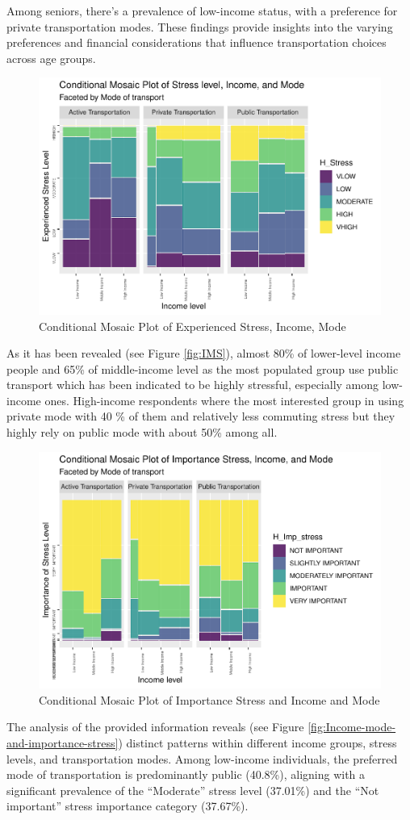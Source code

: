 \documentclass[
11pt, %
oneside, %
english, %
singlespacing, %
]{macthesis} %
\begin{document}
Among seniors, there's a prevalence of low-income status, with a preference for private transportation modes. These findings provide insights into the varying preferences and financial considerations that influence transportation choices across age groups.
\begin{figure}
\includegraphics[width=0.85\linewidth]{thesis_files/figure-latex/unnamed-chunk-31-1} \caption{\label{fig:IMS}Conditional Mosaic Plot of Experienced Stress, Income, Mode}\label{fig:unnamed-chunk-31}
\end{figure}
As it has been revealed (see Figure \ref{fig:IMS}), almost 80\% of lower-level income people and 65\% of middle-income level as the most populated group use public transport which has been indicated to be highly stressful, especially among low-income ones. High-income respondents where the most interested group in using private mode with 40 \% of them and relatively less commuting stress but they highly rely on public mode with about 50\% among all.
\begin{figure}
\includegraphics[width=0.85\linewidth]{thesis_files/figure-latex/unnamed-chunk-32-1} \caption{\label{fig:Income-mode-and-importance-stress}Conditional Mosaic Plot of Importance Stress and Income and Mode}\label{fig:unnamed-chunk-32}
\end{figure}
The analysis of the provided information reveals (see Figure \ref{fig:Income-mode-and-importance-stress}) distinct patterns within different income groups, stress levels, and transportation modes. Among low-income individuals, the preferred mode of transportation is predominantly public (40.8\%), aligning with a significant prevalence of the ``Moderate'' stress level (37.01\%) and the ``Not important'' stress importance category (37.67\%).
\end{document}
